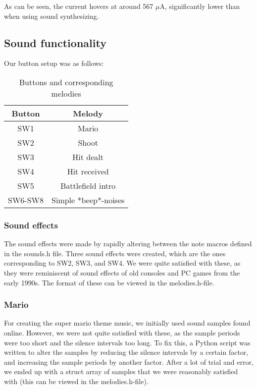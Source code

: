 

As can be seen, the current hovers at around 567 $\mu$A, significantly lower than when using sound synthesizing.

\subsection{Sound functionality}

Our button setup was as follows:

\begin{table}[ht]
\caption{Buttons and corresponding melodies}
\centering
\begin{tabular}{c c}
\hline
\hline %
Button & Melody \\ [0.5ex]
\hline
SW1 & Mario \\
SW2 & Shoot \\
SW3 & Hit dealt \\
SW4 & Hit received \\
SW5 & Battlefield intro \\
SW6-SW8 & Simple *beep*-noises \\
\hline
\end{tabular}
\label{table:nonlin}
\end{table}

\subsubsection{Sound effects}

The sound effects were made by rapidly altering between the note macros defined in the sounds.h file. Three sound effects were created, which are the ones corresponding to SW2, SW3, and SW4. We were quite satisfied with these, as they were reminiscent of sound effects of old consoles and PC games from the early 1990s. The format of these can be viewed in the melodies.h-file.

\subsubsection{Mario}

For creating the super mario theme music, we initially used sound samples found online. However, we were not quite satisfied with these, as the sample periods were too short and the silence intervals too long. To fix this, a Python script was written to alter the samples by reducing the silence intervals by a certain factor, and increasing the sample periods by another factor. After a lot of trial and error, we ended up with a struct array of samples that we were reasonably satisfied with (this can be viewed in the melodies.h-file).

